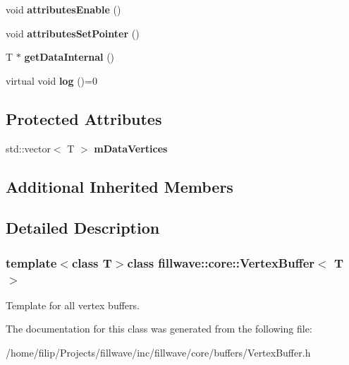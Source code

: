 \begin{DoxyCompactItemize}
\item 
\hypertarget{classfillwave_1_1core_1_1VertexBuffer_ac6112160c13a232110db805b38ec04f4}{}void {\bfseries attributes\+Enable} ()\label{classfillwave_1_1core_1_1VertexBuffer_ac6112160c13a232110db805b38ec04f4}

\item 
\hypertarget{classfillwave_1_1core_1_1VertexBuffer_a5b1e0537b98ee1f14a116ec22060abfa}{}void {\bfseries attributes\+Set\+Pointer} ()\label{classfillwave_1_1core_1_1VertexBuffer_a5b1e0537b98ee1f14a116ec22060abfa}

\item 
\hypertarget{classfillwave_1_1core_1_1VertexBuffer_a5a3a18d7d3d5915bfb70caa1724fa64c}{}T $\ast$ {\bfseries get\+Data\+Internal} ()\label{classfillwave_1_1core_1_1VertexBuffer_a5a3a18d7d3d5915bfb70caa1724fa64c}

\item 
\hypertarget{classfillwave_1_1core_1_1VertexBuffer_ae59174d77aa38b6e7a53d13d789c4b7b}{}virtual void {\bfseries log} ()=0\label{classfillwave_1_1core_1_1VertexBuffer_ae59174d77aa38b6e7a53d13d789c4b7b}

\end{DoxyCompactItemize}
\subsection*{Protected Attributes}
\begin{DoxyCompactItemize}
\item 
\hypertarget{classfillwave_1_1core_1_1VertexBuffer_a141a174e57082d58b204ecb3d8712a34}{}std\+::vector$<$ T $>$ {\bfseries m\+Data\+Vertices}\label{classfillwave_1_1core_1_1VertexBuffer_a141a174e57082d58b204ecb3d8712a34}

\end{DoxyCompactItemize}
\subsection*{Additional Inherited Members}


\subsection{Detailed Description}
\subsubsection*{template$<$class T$>$class fillwave\+::core\+::\+Vertex\+Buffer$<$ T $>$}

Template for all vertex buffers. 

The documentation for this class was generated from the following file\+:\begin{DoxyCompactItemize}
\item 
/home/filip/\+Projects/fillwave/inc/fillwave/core/buffers/Vertex\+Buffer.\+h\end{DoxyCompactItemize}
